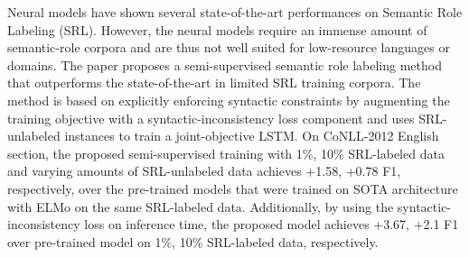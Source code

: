Neural models have shown several state-of-the-art performances on Semantic Role Labeling (SRL). However, the neural models require an immense amount of semantic-role corpora and are thus not well suited for low-resource languages or domains. The paper proposes a semi-supervised semantic role labeling method that outperforms the state-of-the-art in limited SRL training corpora. The method is based on explicitly enforcing syntactic constraints by augmenting the training objective with a syntactic-inconsistency loss component and uses SRL-unlabeled instances to train a joint-objective LSTM. On CoNLL-2012 English section, the proposed semi-supervised training with 1\%, 10\% SRL-labeled data and varying amounts of SRL-unlabeled data achieves +1.58, +0.78 F1, respectively, over the pre-trained models that were trained on SOTA architecture with ELMo on the same SRL-labeled data. Additionally, by using the syntactic-inconsistency loss on inference time, the proposed model achieves +3.67, +2.1 F1 over pre-trained model on 1\%, 10\% SRL-labeled data, respectively.

